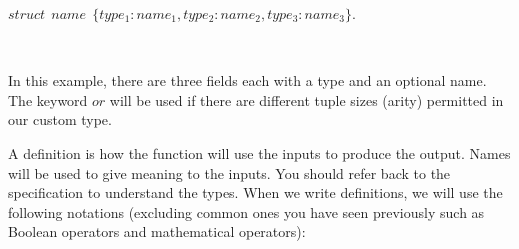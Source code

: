 \documentclass[
]{book}
\begin{document}
\begin{formulabox}
\(struct ~ ~ name ~ ~ \lbrace type_1:name_1, type_2:name_2, type_3:name_3 \rbrace\).

\end{formulabox}

\(\nonumber\)

In this example, there are three fields each with a type and an optional name. The keyword \(or\) will be used if there are different tuple sizes (arity) permitted in our custom type.

A definition is how the function will use the inputs to produce the output. Names will be used to give meaning to the inputs. You should refer back to the specification to understand the types. When we write definitions, we will use the following notations (excluding common ones you have seen previously such as Boolean operators and mathematical operators):
\end{document}
